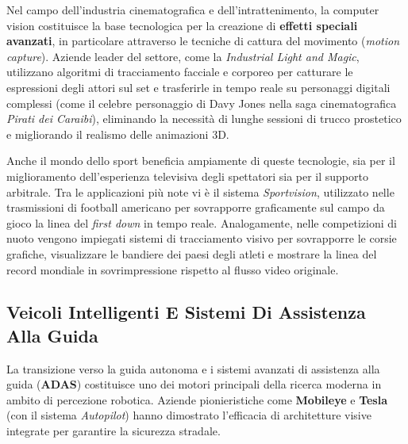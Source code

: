﻿\documentclass[11pt, a4paper]{article}
\begin{document}

Nel campo dell'industria cinematografica e dell'intrattenimento, la computer vision costituisce la base tecnologica per la creazione di \textbf{effetti speciali avanzati}, in particolare attraverso le tecniche di cattura del movimento (\emph{motion capture}). Aziende leader del settore, come la \emph{Industrial Light and Magic}, utilizzano algoritmi di tracciamento facciale e corporeo per catturare le espressioni degli attori sul set e trasferirle in tempo reale su personaggi digitali complessi (come il celebre personaggio di Davy Jones nella saga cinematografica \emph{Pirati dei Caraibi}), eliminando la necessità di lunghe sessioni di trucco prostetico e migliorando il realismo delle animazioni 3D.


Anche il mondo dello sport beneficia ampiamente di queste tecnologie, sia per il miglioramento dell'esperienza televisiva degli spettatori sia per il supporto arbitrale. Tra le applicazioni più note vi è il sistema \emph{Sportvision}, utilizzato nelle trasmissioni di football americano per sovrapporre graficamente sul campo da gioco la linea del \emph{first down} in tempo reale. Analogamente, nelle competizioni di nuoto vengono impiegati sistemi di tracciamento visivo per sovrapporre le corsie grafiche, visualizzare le bandiere dei paesi degli atleti e mostrare la linea del record mondiale in sovrimpressione rispetto al flusso video originale.


\newpage

\subsection{Veicoli Intelligenti E Sistemi Di Assistenza Alla Guida}

La transizione verso la guida autonoma e i sistemi avanzati di assistenza alla guida (\textbf{ADAS}) costituisce uno dei motori principali della ricerca moderna in ambito di percezione robotica. Aziende pionieristiche come \textbf{Mobileye} e \textbf{Tesla} (con il sistema \emph{Autopilot}) hanno dimostrato l'efficacia di architetture visive integrate per garantire la sicurezza stradale.
\end{document}
